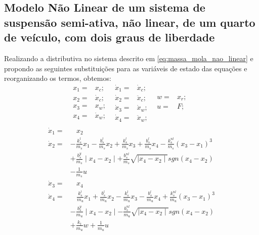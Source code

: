 \subsection{Modelo Não Linear de um sistema de suspensão semi-ativa, não linear, de um quarto de veículo, com dois graus de liberdade }
Realizando a distributiva no sistema descrito em \ref{eq:massa_mola_nao_linear} e propondo as seguintes substituições para as variáveis de estado das equações e reorganizando os termos, obtemos: 
\begin{equation*}
    \begin{split}
        x_{1}=&x_{c};\ \ \\
        x_{2}=&\dot{x}_{c};\ \ \\ 
        x_{3}=&x_{w};\ \ \\               
        x_{4}=&\dot{x}_{w};\ \ \\
    \end{split}
    \begin{split}
        \dot{x}_{1}=&\dot{x}_{c};\ \ \\
        \dot{x}_{2}=&\ddot{x}_{c};\ \ \\
        \dot{x}_{3}=&\dot{x}_{w};\ \ \\        
        \dot{x}_{4}=&\ddot{x}_{w};\ \ \\
    \end{split}
    \begin{split}
        w=&x_{r};\ \ \\
        u=&F;\ \ \\
    \end{split} 
\end{equation*}
\begin{equation} \label{eq:massa_mola_nao_linear_SS}
    \begin{aligned}
        \dot{x}_{1}=&\ \ \ \ x_{2}\\        
        \dot{x}_{2}=&-\frac{k^l_s}{m_s}x_1-\frac{b^l_s}{m_s}x_2+\frac{k^l_s}{m_s}x_3+\frac{b^l_s}{m_s}x_4-\frac{k^{nl}_s}{m_s}(x_3-x_1)^3\\
                    &+\frac{b^y_s}{m_s}\mid x_4-x_2\mid+\frac{b^{nl}_s}{m_s}\sqrt{\mid x_4-x_2\mid}sgn(x_4-x_2)\\
                    &-\frac{1}{m_s}u\\    
        \dot{x}_{3}=&\ \ \ \ x_{4}\\
        \dot{x}_{4}=&\ \ \ \ \frac{k^l_s}{m_u}x_1+\frac{b^l_s}{m_u}x_2-\frac{k^l_s}{m_u}x_3-\frac{b^l_s}{m_u}x_4+\frac{k^{nl}_s}{m_u}(x_3-x_1)^3\\
                    &-\frac{b^y_s}{m_u}\mid x_4-x_2\mid-\frac{b^{nl}_s}{m_u}\sqrt{\mid x_4-x_2\mid}sgn(x_4-x_2)\\
                    &+\frac{k_t}{m_u}w+\frac{1}{m_u}u\\
    \end{aligned}
\end{equation}
    
